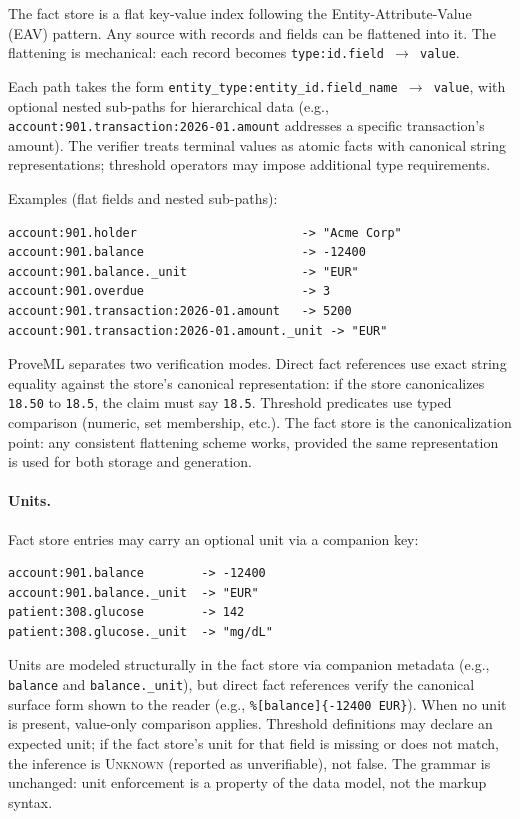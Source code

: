 \documentclass[11pt,a4paper]{article}
\begin{document}
The fact store is a flat key-value index following the Entity-Attribute-Value (EAV) pattern. Any source with records and fields can be flattened into it. The flattening is mechanical: each record becomes \texttt{type:id.field $\rightarrow$ value}.

Each path takes the form \texttt{entity\_type:entity\_id.field\_name $\rightarrow$ value}, with optional nested sub-paths for hierarchical data (e.g., \texttt{account:901.transaction:2026-01.amount} addresses a specific transaction's amount). The verifier treats terminal values as atomic facts with canonical string representations; threshold operators may impose additional type requirements.

\noindent Examples (flat fields and nested sub-paths):

\begin{lstlisting}
account:901.holder                       -> "Acme Corp"
account:901.balance                      -> -12400
account:901.balance._unit                -> "EUR"
account:901.overdue                      -> 3
account:901.transaction:2026-01.amount   -> 5200
account:901.transaction:2026-01.amount._unit -> "EUR"
\end{lstlisting}

\noindent ProveML separates two verification modes. Direct fact references use exact string equality against the store's canonical representation: if the store canonicalizes \texttt{18.50} to \texttt{18.5}, the claim must say \texttt{18.5}. Threshold predicates use typed comparison (numeric, set membership, etc.). The fact store is the canonicalization point: any consistent flattening scheme works, provided the same representation is used for both storage and generation.

\paragraph{Units.} Fact store entries may carry an optional unit via a companion key:

\begin{lstlisting}
account:901.balance        -> -12400
account:901.balance._unit  -> "EUR"
patient:308.glucose        -> 142
patient:308.glucose._unit  -> "mg/dL"
\end{lstlisting}

\noindent Units are modeled structurally in the fact store via companion metadata (e.g., \texttt{balance} and \texttt{balance.\_unit}), but direct fact references verify the canonical surface form shown to the reader (e.g., \texttt{\%[balance]\{-12400 EUR\}}). When no unit is present, value-only comparison applies. Threshold definitions may declare an expected unit; if the fact store's unit for that field is missing or does not match, the inference is \textsc{Unknown} (reported as unverifiable), not false. The grammar is unchanged: unit enforcement is a property of the data model, not the markup syntax.
\end{document}
